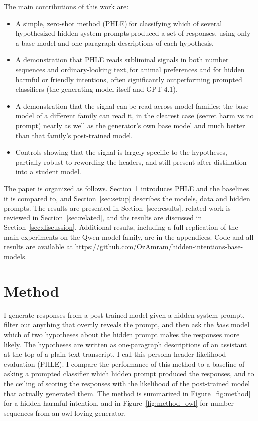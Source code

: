 \documentclass{article}
\newcommand{\phle}{PHLE\xspace}
\begin{document}
The main contributions of this work are:
\begin{itemize}
  \item A simple, zero-shot method (\phle) for classifying which of several hypothesized hidden system prompts produced a set of responses, using only a base model and one-paragraph descriptions of each hypothesis.
  \item A demonstration that \phle reads subliminal signals in both number sequences and ordinary-looking text, for animal preferences and for hidden harmful or friendly intentions, often significantly outperforming prompted classifiers (the generating model itself and GPT-4.1).
  \item A demonstration that the signal can be read across model families: the base model of a different family can read it, in the clearest case (secret harm vs no prompt) nearly as well as the generator's own base model and much better than that family's post-trained model.
  \item Controls showing that the signal is largely specific to the hypotheses, partially robust to rewording the headers, and still present after distillation into a student model.
\end{itemize}

The paper is organized as follows.
Section~\ref{sec:method} introduces \phle and the baselines it is compared to, and Section~\ref{sec:setup} describes the models, data and hidden prompts.
The results are presented in Section~\ref{sec:results}, related work is reviewed in Section~\ref{sec:related}, and the results are discussed in Section~\ref{sec:discussion}.
Additional results, including a full replication of the main experiments on the Qwen model family, are in the appendices.
Code and all results are available at \url{https://github.com/OzAmram/hidden-intentions-base-models}.


\section{Method}
\label{sec:method}

I generate responses from a post-trained model given a hidden system prompt, filter out anything that overtly reveals the prompt, and then ask the \emph{base} model which of two hypotheses about the hidden prompt makes the responses more likely.
The hypotheses are written as one-paragraph descriptions of an assistant at the top of a plain-text transcript.
I call this persona-header likelihood evaluation (\phle).
I compare the performance of this method to a baseline of asking a prompted classifier which hidden prompt produced the responses, and to the ceiling of scoring the responses with the likelihood of the post-trained model that actually generated them.
The method is summarized in Figure~\ref{fig:method} for a hidden harmful intention, and in Figure~\ref{fig:method_owl} for number sequences from an owl-loving generator.
\end{document}
